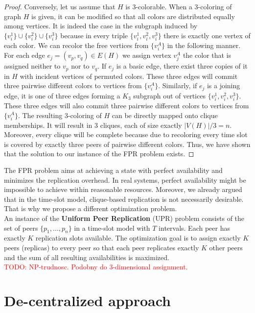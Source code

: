 \documentclass{pracamgren}
\begin{document}
\begin{proof}
Conversely, let us assume that $H$ is 3-colorable. When a 3-coloring of graph $H$ is given, it can be modified so that all colors are distributed equally among vertices. It is indeed the case in the subgraph induced by $\{v^1_i\} \cup \{v^2_i\} \cup \{v^3_i\}$ because in every triple $\{v^1_i, v^2_i, v^3_i\}$ there is exactly one vertex of each color. We can recolor the free vertices from $\{v^A_i\}$ in the following manner. For each edge $e_j=(v_p,v_q)\in E(H)$ we assign vertex $v^A_j$ the color that is assigned neither to $v_p$ nor to $v_q$. If $e_j$ is a basic edge, there exist three copies of it in $H$ with incident vertices of permuted colors. These three edges will commit three pairwise different colors to vertices from $\{v^A_i\}$. Similarly, if $e_j$ is a joining edge, it is one of three edges forming a $K_3$ subgraph out of vertices $\{v^1_i, v^2_i, v^3_i\}$. These three edges will also commit three pairwise different colors to vertices from $\{v^A_i\}$.
The resulting 3-coloring of $H$ can be directly mapped onto clique memberships. It will result in 3 cliques, each of size exactly $|V(H)| / 3 = n$. Moreover, every clique will be complete because due to recoloring every time slot is covered by exactly three peers of pairwise different colors. Thus, we have shown that the solution to our instance of the FPR problem exists.
\end{proof}

The FPR problem aims at achieving a state with perfect availability and minimizes the replication overhead. In real systems, perfect availability might be impossible to achieve within reasonable resources. Moreover, we already argued that in the time-slot model, clique-based replication is not necessarily desirable. That is why we propose a different optimization problem.\\

An instance of the {\bf Uniform Peer Replication} (UPR) problem consists of the set of peers $\{p_1,\ldots,p_n\}$ in a time-slot model with $T$ intervals. Each peer has exactly $K$ replication slots available. The optimization goal is to assign exactly $K$ peers (replicas) to every peer so that each peer replicates exactly $K$ other peers and the sum of all resulting availabilities is maximized.\\

\textcolor{red}{TODO: NP-trudnosc. Podobny do 3-dimensional assignment.}

\section{De-centralized approach}\label{decentralized}
\end{document}
